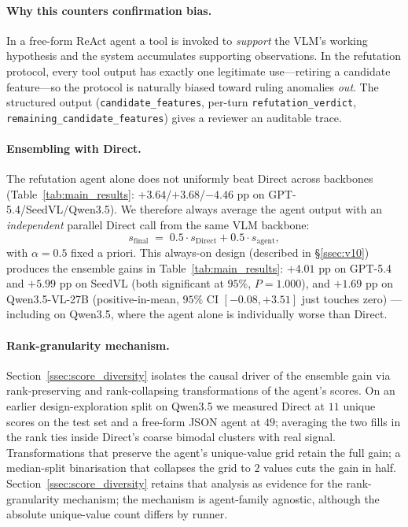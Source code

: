 \paragraph{Why this counters confirmation bias.}
In a free-form ReAct agent a tool is invoked to \emph{support} the VLM's working hypothesis and the system accumulates supporting observations. In the refutation protocol, every tool output has exactly one legitimate use---retiring a candidate feature---so the protocol is naturally biased toward ruling anomalies \emph{out}. The structured output (\texttt{candidate\_features}, per-turn \texttt{refutation\_verdict}, \texttt{remaining\_candidate\_features}) gives a reviewer an auditable trace.

\paragraph{Ensembling with Direct.}
The refutation agent alone does not uniformly beat Direct across backbones (Table~\ref{tab:main_results}: $+3.64$/$+3.68$/$-4.46$ pp on GPT-5.4/SeedVL/Qwen3.5). We therefore always average the agent output with an \emph{independent} parallel Direct call from the same VLM backbone:
\[
  s_{\mathrm{final}} \;=\; 0.5 \cdot s_{\mathrm{Direct}} + 0.5 \cdot s_{\mathrm{agent}},
\]
with $\alpha{=}0.5$ fixed a priori. This always-on design (described in \S\ref{ssec:v10}) produces the ensemble gains in Table~\ref{tab:main_results}: $+4.01$ pp on GPT-5.4 and $+5.99$ pp on SeedVL (both significant at $95\%$, $P{=}1.000$), and $+1.69$ pp on Qwen3.5-VL-27B (positive-in-mean, $95\%$ CI $[-0.08,+3.51]$ just touches zero) --- including on Qwen3.5, where the agent alone is individually worse than Direct.

\paragraph{Rank-granularity mechanism.}
Section~\ref{ssec:score_diversity} isolates the causal driver of the ensemble gain via rank-preserving and rank-collapsing transformations of the agent's scores. On an earlier design-exploration split on Qwen3.5 we measured Direct at $11$ unique scores on the test set and a free-form JSON agent at $49$; averaging the two fills in the rank ties inside Direct's coarse bimodal clusters with real signal. Transformations that preserve the agent's unique-value grid retain the full gain; a median-split binarisation that collapses the grid to $2$ values cuts the gain in half. Section~\ref{ssec:score_diversity} retains that analysis as evidence for the rank-granularity mechanism; the mechanism is agent-family agnostic, although the absolute unique-value count differs by runner.


